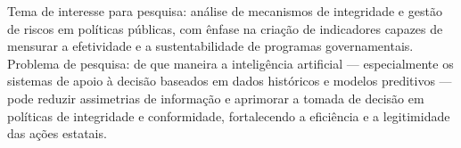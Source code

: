 \documentclass[12pt]{article}
\begin{document}
Tema de interesse para pesquisa: análise de mecanismos de integridade e gestão de riscos em políticas públicas, com ênfase na criação de indicadores capazes de mensurar a efetividade e a sustentabilidade de programas governamentais. Problema de pesquisa: de que maneira a inteligência artificial — especialmente os sistemas de apoio à decisão baseados em dados históricos e modelos preditivos — pode reduzir assimetrias de informação e aprimorar a tomada de decisão em políticas de integridade e conformidade, fortalecendo a eficiência e a legitimidade das ações estatais.
\end{document}
